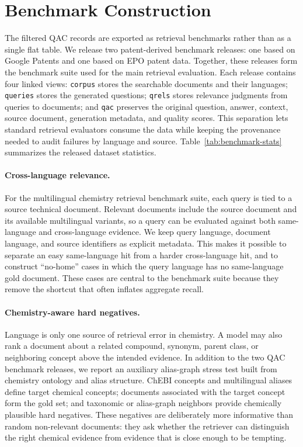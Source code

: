 \section{Benchmark Construction}

The filtered QAC records are exported as retrieval benchmarks rather than as a
single flat table. We release two patent-derived benchmark releases: one based
on Google Patents and one based on EPO patent data. Together, these releases
form the benchmark suite used for the main retrieval evaluation. Each release contains four linked
views: \texttt{corpus} stores the searchable documents and their languages;
\texttt{queries} stores the generated questions; \texttt{qrels} stores relevance
judgments from queries to documents; and \texttt{qac} preserves the original
question, answer, context, source document, generation metadata, and quality
scores. This separation lets standard retrieval evaluators consume the data while
keeping the provenance needed to audit failures by language and source.
Table~\ref{tab:benchmark-stats} summarizes the released dataset statistics.



\paragraph{Cross-language relevance.}
For the multilingual chemistry retrieval benchmark suite, each query is tied to a
source technical document. Relevant documents include the source document and
its available multilingual variants, so a query can be evaluated against both
same-language and cross-language evidence. We keep query language, document
language, and source identifiers as explicit metadata. This makes it possible to
separate an easy same-language hit from a harder cross-language hit, and to
construct ``no-home'' cases in which the query language has no same-language
gold document. These cases are central to the benchmark suite because they remove the
shortcut that often inflates aggregate recall.

\paragraph{Chemistry-aware hard negatives.}
Language is only one source of retrieval error in chemistry. A model may also
rank a document about a related compound, synonym, parent class, or neighboring
concept above the intended evidence. In addition to the two QAC benchmark
releases, we report an auxiliary alias-graph stress test built from chemistry
ontology and alias structure. ChEBI concepts and multilingual aliases define
target chemical concepts; documents associated with the target concept form the
gold set; and taxonomic or alias-graph neighbors provide chemically plausible
hard negatives. These negatives are deliberately more informative than random
non-relevant documents: they ask whether the retriever can distinguish the right
chemical evidence from evidence that is close enough to be tempting.

